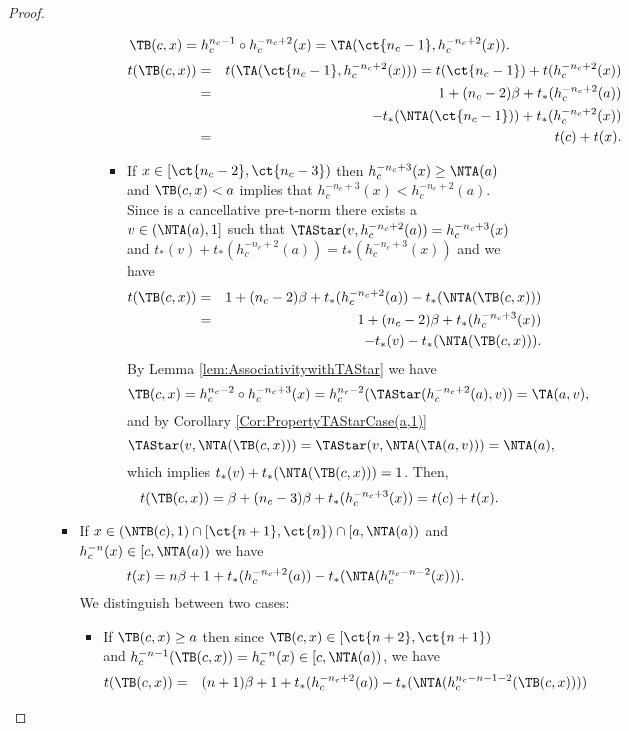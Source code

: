 \begin{proof}
\begin{enumerate}[label=(\roman*)]
\begin{itemize}
\begin{itemize}
\begin{itemize}
\begin{itemize}
						$$\TB(c,x)= h_c^{n_c-1} \circ h_c^{-n_c+2}(x) = \TA(\ct{n_c-1},h_c^{-n_c+2}(x)).$$
						\begin{eqnarray*}
							t(\TB(c,x)) &=& t(\TA(\ct{n_c-1},h_c^{-n_c+2}(x))) = t(\ct{n_c-1}) + t(h_c^{-n_c+2}(x)) \\
							&=& 1 + (n_c-2)\beta + t_*(h_c^{-n_c+2}(a)) \\
							& & - t_*(\NTA(\ct{n_c-1})) + t_*(h_c^{-n_c+2}(x)) \\
							&=& t(c)+t(x).
						\end{eqnarray*}
						\item If $x \in [\ct{n_c-2},\ct{n_c-3})$ then $h_c^{-n_c+3}(x) \geq \NTA(a)$ and $\TB(c,x) < a$ implies that $h_c^{-n_c+3}(x) < h_c^{-n_c+2}(a)$. Since \TAStar is a cancellative pre-t-norm there exists a $v \in (\NTA(a),1]$ such that  $\TAStar(v,h_c^{-n_c+2}(a))=h_c^{-n_c+3}(x)$ and $t_*(v)+t_*(h_c^{-n_c+2}(a)) = t_*(h_c^{-n_c+3}(x))$ and we have
						\begin{eqnarray*}
							t(\TB(c,x)) &=& 1 + (n_c-2)\beta + t_*(h_c^{-n_c+2}(a))-t_*(\NTA(\TB(c,x))) \\
							&=& 1 + (n_c-2)\beta + t_*(h_c^{-n_c+3}(x))\\
							& & -t_*(v)-t_*(\NTA(\TB(c,x))).
						\end{eqnarray*}
						By Lemma \ref{lem:AssociativitywithTAStar} we have
						$$\TB(c,x)=h_c^{n_c-2} \circ h_c^{-n_c+3}(x)=h_c^{n_c-2}(\TAStar(h_c^{-n_c+2}(a),v)) = \TA(a,v),$$
						and by Corollary \ref{Cor:PropertyTAStarCase(a,1)}
						$$\TAStar(v,\NTA(\TB(c,x)))=\TAStar(v,\NTA(\TA(a,v))) = \NTA(a),$$
						which implies $t_*(v)+t_*(\NTA(\TB(c,x))) = 1$. Then,
						$$t(\TB(c,x)) = \beta + (n_c-3)\beta + t_*(h_c^{-n_c+3}(x)) = t(c)+t(x).$$
					\end{itemize}
				\end{itemize}
				\item If $x \in (\NTB(c),1) \cap  [\ct{n+1},\ct{n}) \cap [a,\NTA(a))$ and $h_c^{-n}(x) \in [c,\NTA(a))$ we have
				$$t(x)=n\beta+1+t_*(h_c^{-n_c+2}(a)) - t_*(\NTA(h_c^{n_c-n-2}(x))).$$
				We distinguish between two cases:
				\begin{itemize}
					\item If $\TB(c,x)\geq a$ then since $\TB(c,x) \in [\ct{n+2},\ct{n+1})$ and $h_c^{-n-1}(\TB(c,x)) = h_c^{-n}(x) \in [c,\NTA(a))$, we have
					\begin{eqnarray*}
						t(\TB(c,x)) &=& (n+1)\beta+1+t_*(h_c^{-n_c+2}(a)) - t_*(\NTA(h_c^{n_c-n-1-2}(\TB(c,x)))) \\

\end{eqnarray*}
\end{itemize}
\end{itemize}
\end{itemize}
\end{enumerate}
\end{proof}
